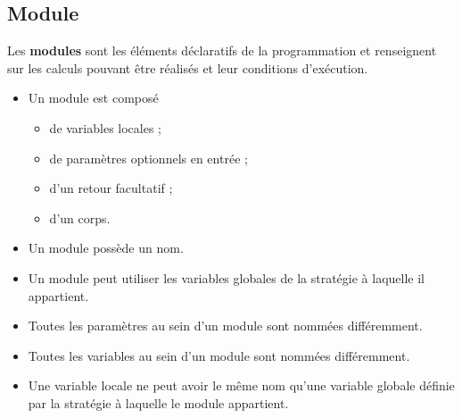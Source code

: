 \subsection{Module}
Les \textbf{modules} sont les éléments déclaratifs de la programmation et renseignent sur les calculs pouvant être réalisés et leur conditions d'exécution.
\begin{itemize}
    \item Un module est composé
        \begin{itemize}
            \item de variables locales ;
            \item de paramètres optionnels en entrée ;
            \item d'un retour facultatif ;
            \item d'un corps.
        \end{itemize}
    \item Un module possède un nom.
    \item Un module peut utiliser les variables globales de la stratégie à laquelle il appartient.
    \item Toutes les paramètres au sein d'un module sont nommées différemment.
    \item Toutes les variables au sein d'un module sont nommées différemment.
    \item Une variable locale ne peut avoir le même nom qu'une variable globale définie par la stratégie à laquelle le module appartient.
\end{itemize}

